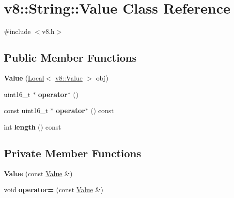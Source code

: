 \hypertarget{classv8_1_1_string_1_1_value}{}\section{v8\+:\+:String\+:\+:Value Class Reference}
\label{classv8_1_1_string_1_1_value}


{\ttfamily \#include $<$v8.\+h$>$}

\subsection*{Public Member Functions}
\begin{DoxyCompactItemize}
\item 
{\bfseries Value} (\hyperlink{classv8_1_1_local}{Local}$<$ \hyperlink{classv8_1_1_value}{v8\+::\+Value} $>$ obj)\hypertarget{classv8_1_1_string_1_1_value_a5b968a237946fb3313527797f04a7e0f}{}\label{classv8_1_1_string_1_1_value_a5b968a237946fb3313527797f04a7e0f}

\item 
uint16\+\_\+t $\ast$ {\bfseries operator$\ast$} ()\hypertarget{classv8_1_1_string_1_1_value_ae4f44b1977968de2e9f2ff703437fde3}{}\label{classv8_1_1_string_1_1_value_ae4f44b1977968de2e9f2ff703437fde3}

\item 
const uint16\+\_\+t $\ast$ {\bfseries operator$\ast$} () const \hypertarget{classv8_1_1_string_1_1_value_a1cf21001f92284f290a6e550d567e757}{}\label{classv8_1_1_string_1_1_value_a1cf21001f92284f290a6e550d567e757}

\item 
int {\bfseries length} () const \hypertarget{classv8_1_1_string_1_1_value_a4b5014d7d4d0f60d39f37e421ae2eb91}{}\label{classv8_1_1_string_1_1_value_a4b5014d7d4d0f60d39f37e421ae2eb91}

\end{DoxyCompactItemize}
\subsection*{Private Member Functions}
\begin{DoxyCompactItemize}
\item 
{\bfseries Value} (const \hyperlink{classv8_1_1_string_1_1_value}{Value} \&)\hypertarget{classv8_1_1_string_1_1_value_a50e172dcf65d58dd841661d8e470a83b}{}\label{classv8_1_1_string_1_1_value_a50e172dcf65d58dd841661d8e470a83b}

\item 
void {\bfseries operator=} (const \hyperlink{classv8_1_1_string_1_1_value}{Value} \&)\hypertarget{classv8_1_1_string_1_1_value_a7c7c08118ea32b67265952c7e7af54c4}{}\label{classv8_1_1_string_1_1_value_a7c7c08118ea32b67265952c7e7af54c4}

\end{DoxyCompactItemize}
